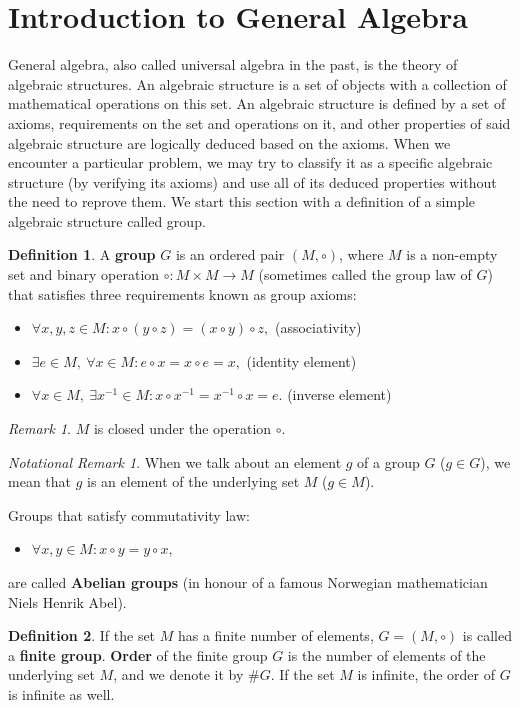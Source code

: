 \documentclass[thesis=M,english]{FITthesis}[2012/10/20]
\theoremstyle{remark}
\newtheorem*{RM}{Remark}
\newtheorem*{NRM}{Notational Remark}
\theoremstyle{definition}
\newtheorem{DF}{Definition}[section]
\begin{document}
\section{Introduction to General Algebra}
General algebra, also called universal algebra in the past, is the theory of algebraic structures. An algebraic structure is a set of objects with a collection of mathematical operations on this set.  An algebraic structure is defined by a set of axioms, requirements on the set and operations on it, and other properties of said algebraic structure are logically deduced based on the axioms. When we encounter a particular problem, we may try to classify it as a specific algebraic structure (by verifying its axioms) and use all of its deduced properties without the need to reprove them. We start this section with a definition of a simple algebraic structure called group.
\begin{DF}
A \textbf{group} $G$ is an ordered pair $(M,  \circ)$, where $M$ is a non-empty set and binary operation $\circ : M \times M \to M $ (sometimes called the group law of $G$) that satisfies three requirements known as group axioms: 
\end{DF}
\begin{itemize}
\item 
$ \forall x,y,z \in M: x\circ (y \circ z) = (x \circ y) \circ z,$ \hfill (associativity)
\item 
$ \exists e \in M,\ \forall x \in M: e \circ x = x \circ e = x,$ \hfill (identity element)
\item 
$\forall x \in M,\ \exists x^{-1} \in M: x \circ x^{-1} = x^{-1} \circ x = e.$ \hfill (inverse element)
\end{itemize}
\begin{RM}
$M$ is closed under the operation $\circ$. 
\end{RM}
\begin{NRM}
When we talk about an element $g$ of a group $G$ ($g \in G$), we mean that $g$ is an element of the underlying set $M$ ($g \in M$).
\end{NRM}
Groups that satisfy commutativity law:
\begin{itemize}
\item 
$ \forall x, y\in M: x \circ y = y \circ x,$
\end{itemize}
are called \textbf{Abelian groups} (in honour of a famous Norwegian mathematician Niels Henrik Abel). 
\begin{DF}
If the set $M$ has a finite number of elements, $G = (M, \circ)$ is called a \textbf{finite group}. \textbf{Order} of the finite group $G$ is the number of elements of the underlying set $M$, and we denote it by $\#G$. If the set $M$ is infinite, the order of $G$ is infinite as well.
\end{DF}
\end{document}
